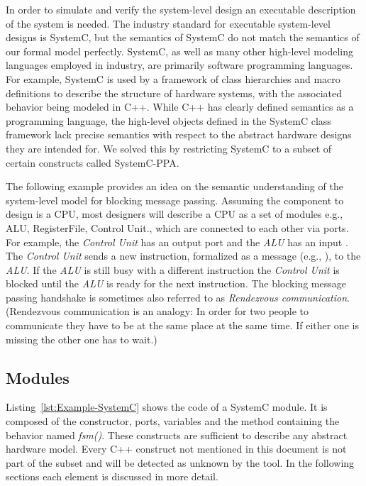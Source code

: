 In order to simulate and verify the system-level design an executable
description of the system is needed. %
The industry standard for executable system-level designs is SystemC,
but the semantics of SystemC do not match the semantics of our formal
model perfectly. %
SystemC, as well as many other high-level modeling languages employed
in industry, are primarily software programming languages. %
For example, SystemC is used by a framework of class hierarchies and
macro definitions to describe the structure of hardware systems, with
the associated behavior being modeled in C++. %
While C++ has clearly defined semantics as a programming language, the
high-level objects defined in the SystemC class framework lack precise
semantics with respect to the abstract hardware designs they are
intended for. %
We solved this by restricting SystemC to a subset of certain
constructs called SystemC-PPA. %

The following example provides an idea on the semantic understanding
of the system-level model for blocking message passing. %
Assuming the component to design is a CPU, most designers will
describe a CPU as a set of modules e.g., ALU, RegisterFile, Control
Unit., which are connected to each other via ports. %
For example, the \textit{Control Unit} has an output port
 and the \textit{ALU} has an input
. %
The \textit{Control Unit} sends a new instruction, formalized as a
message (e.g., ), to the \textit{ALU}. %
If the \textit{ALU} is still busy with a different instruction the
\textit{Control Unit} is blocked until the \textit{ALU} is ready for
the next instruction. %
The blocking message passing handshake is sometimes also referred to
as \textit{Rendezvous communication}. %
(Rendezvous communication is an analogy: %
In order for two people to communicate they have to be at the same
place at the same time. %
If either one is missing the other one has to wait.) %

\subsection{Modules}
Listing~\ref{lst:Example-SystemC} shows the code of a SystemC
module. %
It is composed of the constructor, ports, variables and the method
containing the behavior named \textit{fsm()}. %
These constructs are sufficient to describe any abstract hardware
model. %
Every C++ construct not mentioned in this document is not part of the
subset and will be detected as unknown by the tool. %
In the following sections each element is discussed in more detail. %


